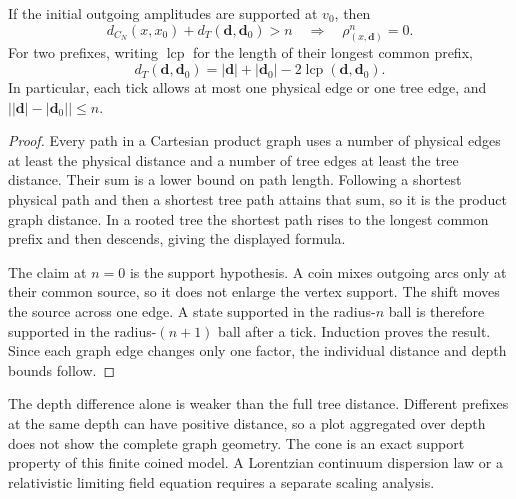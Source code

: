 \begin{proposition}
\label{a-limit-walk-cone}
If the initial outgoing amplitudes are supported at $v_0$, then
\begin{equation}
 d_{C_N}(x,x_0)+d_T(\mathbf d,\mathbf d_0)>n
 \quad\Longrightarrow\quad\rho_{(x,\mathbf d)}^n=0.
 \label{a-limit-product-cone}
\end{equation}
For two prefixes, writing $\operatorname{lcp}$ for the length of their
longest common prefix,
\[
 d_T(\mathbf d,\mathbf d_0)
 =|\mathbf d|+|\mathbf d_0|-2\operatorname{lcp}(\mathbf d,\mathbf d_0).
\]
In particular, each tick allows at most one physical edge or one tree
edge, and $\bigl||\mathbf d|-|\mathbf d_0|\bigr|\leq n$.
\end{proposition}
\begin{proof}
Every path in a Cartesian product graph uses a number of physical edges
at least the physical distance and a number of tree edges at least the
tree distance. Their sum is a lower bound on path length. Following a
shortest physical path and then a shortest tree path attains that sum,
so it is the product graph distance. In a rooted tree the shortest path
rises to the longest common prefix and then descends, giving the
displayed formula.

The claim at $n=0$ is the support hypothesis. A coin mixes outgoing
arcs only at their common source, so it does not enlarge the vertex
support. The shift moves the source across one edge. A state supported
in the radius-$n$ ball is therefore supported in the radius-$(n+1)$
ball after a tick. Induction proves the result. Since each graph edge
changes only one factor, the individual distance and depth bounds follow.
\end{proof}

The depth difference alone is weaker than the full tree distance.
Different prefixes at the same depth can have positive distance, so a
plot aggregated over depth does not show the complete graph geometry.
The cone is an exact support property of this finite coined model.
A Lorentzian continuum dispersion law or a relativistic limiting field
equation requires a separate scaling analysis.


